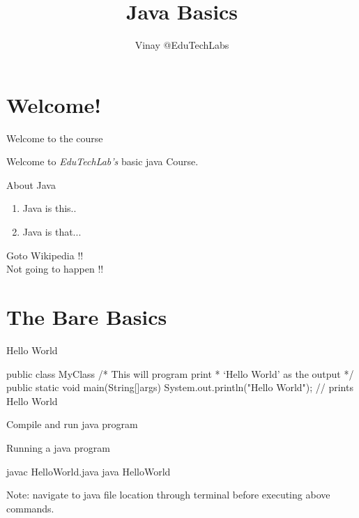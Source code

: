 \documentclass[11pt]{beamer}
\author{Vinay @EduTechLabs}
\title{Java Basics}
\begin{document}
\section{Welcome!}
\frame{\maketitle}
\begin{frame}{Welcome to the course}
	\begin{center}
	 Welcome to \emph{\color{pblue}EduTechLab's} basic java Course.
	\end{center}
\end{frame}


\begin{frame}{About Java}
	\begin{enumerate}
	\item Java is this..
	\item Java is that...
	\end{enumerate}
	
	\huge Goto Wikipedia !!\\
	
	\normalsize Not going to happen !!
\end{frame}



\section{The Bare Basics}
\begin{frame}[containsverbatim]{Hello World}
\begin{java}
public class MyClass{
/* This will program print 
 * `Hello World' as the output
 */
	public static void main(String[]args){
		System.out.println("Hello World"); 
		// prints Hello World
	}
}
\end{java}
\end{frame}

\begin{frame}[containsverbatim]{Compile and run java program}
	\begin{flushleft}
	
	
		\item{Running a java program} \\
		\begin{java}
		javac HelloWorld.java
		java HelloWorld
		\end{java}
		\item{Note: navigate to java file location through terminal before executing above commands.}
	\end{flushleft}
	
\end{frame}
\end{document}
